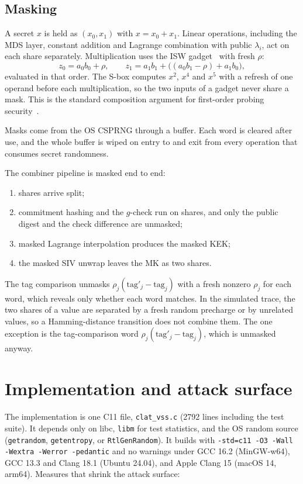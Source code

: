 \documentclass[10pt,a4paper]{article}
\newcommand{\code}[1]{\texttt{#1}}
\theoremstyle{definition}
\theoremstyle{remark}
\begin{document}
\subsection{Masking}\label{sec:masking}
A secret $x$ is held as $(x_0, x_1)$ with $x = x_0 + x_1$. Linear operations, including the MDS layer, constant addition and Lagrange combination with public $\lambda_i$, act on each share separately. Multiplication uses the ISW gadget~\cite{isw} with fresh $\rho$:
\[
  z_0 = a_0 b_0 + \rho,\qquad z_1 = a_1 b_1 + \bigl((a_0 b_1 - \rho) + a_1 b_0\bigr),
\]
evaluated in that order. The S-box computes $x^2$, $x^4$ and $x^5$ with a refresh of one operand before each multiplication, so the two inputs of a gadget never share a mask. This is the standard composition argument for first-order probing security~\cite{isw,sni}.

Masks come from the OS CSPRNG through a buffer. Each word is cleared after use, and the whole buffer is wiped on entry to and exit from every operation that consumes secret randomness.

The combiner pipeline is masked end to end:
\begin{enumerate}
  \item shares arrive split;
  \item commitment hashing and the $g$-check run on shares, and only the public digest and the check difference are unmasked;
  \item masked Lagrange interpolation produces the masked KEK;
  \item the masked SIV unwrap leaves the MK as two shares.
\end{enumerate}

The tag comparison unmasks $\rho_j(\text{tag}'_j - \text{tag}_j)$ with a fresh nonzero $\rho_j$ for each word, which reveals only whether each word matches. In the simulated trace, the two shares of a value are separated by a fresh random precharge or by unrelated values, so a Hamming-distance transition does not combine them. The one exception is the tag-comparison word $\rho_j(\text{tag}'_j - \text{tag}_j)$, which is unmasked anyway.

\section{Implementation and attack surface}\label{sec:impl}

The implementation is one C11 file, \code{clat\_vss.c} (2792 lines including the test suite). It depends only on libc, \code{libm} for test statistics, and the OS random source (\code{getrandom}, \code{getentropy}, or \code{RtlGenRandom}). It builds with \code{-std=c11 -O3 -Wall -Wextra -Werror -pedantic} and no warnings under GCC 16.2 (MinGW-w64), GCC 13.3 and Clang 18.1 (Ubuntu 24.04), and Apple Clang 15 (macOS 14, arm64). Measures that shrink the attack surface:
\end{document}
